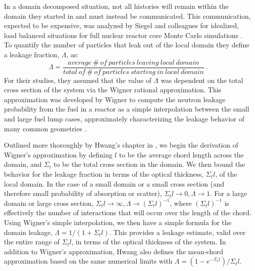 \documentclass{mc2013}
\begin{document}
In a domain decomposed situation, not all histories will remain within
the domain they started in and must instead be communicated. This
communication, expected to be expensive, was analyzed by Siegel and
colleagues for idealized, load balanced situations for full nuclear
reactor core Monte Carlo simulations \cite{siegel_analysis_2012}.  To
quantify the number of particles that leak out of the local domain
they define a leakage fraction, $\Lambda$, as:
\begin{equation}
  \Lambda = \frac{average\ \#\ of\ particles\ leaving\ local\ domain}
          {total\ of\ \#\ of\ particles\ starting\ in\ local\ domain}\:.
  \label{eq:leakage_fraction}
\end{equation}
For their studies, they assumed that the value of $\Lambda$ was
dependent on the total cross section of the system via the Wigner
rational approximation. This approximation was developed by Wigner to
compute the neutron leakage probability from the fuel in a reactor as
a simple interpolation between the small and large fuel lump cases,
approximately characterizing the leakage behavior of many common
geometries \cite{duderstadt_nuclear_1976}. 

Outlined more thoroughly by Hwang's chapter in
\cite{azmy_nuclear_2010}, we begin the derivation of Wigner's
approximation by defining $l$ to be the average chord length across
the domain, and $\Sigma_t$ to be the total cross section in the
domain. We then bound the behavior for the leakage fraction in terms
of the optical thickness, $\Sigma_t l$, of the local domain. In the
case of a small domain or a small cross section (and therefore small
probability of absorption or scatter), $\Sigma_t l \rightarrow 0,
\Lambda \rightarrow 1$. For a large domain or large cross section,
$\Sigma_t l \rightarrow \infty, \Lambda \rightarrow (\Sigma_t
l)^{-1}$, where $(\Sigma_t l)^{-1}$ is effectively the number of
interactions that will occur over the length of the chord. Using
Wigner's simple interpolation, we then have a simple formula for the
domain leakage, $\Lambda = 1/(1+\Sigma_t l)$. This provides a leakage
estimate, valid over the entire range of $\Sigma_t l$, in terms of the
optical thickness of the system. In addition to Wigner's
approximation, Hwang also defines the mean-chord approximation based
on the same numerical limits with $\Lambda = (1-e^{-\Sigma_t
  l})/\Sigma_t l$.
\end{document}
